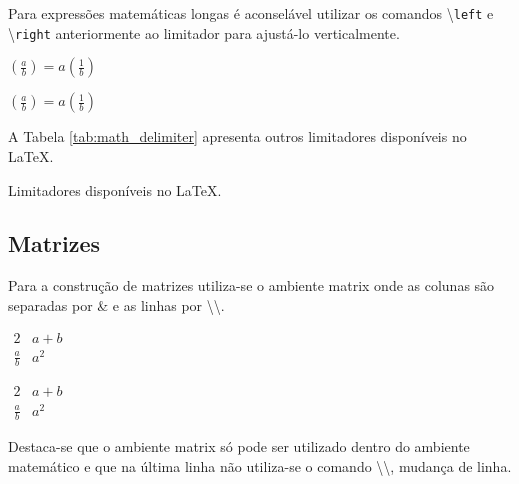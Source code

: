 Para expressões matemáticas longas é aconselável utilizar os comandos \textbackslash\texttt{left} e \textbackslash\texttt{right} anteriormente ao limitador para ajustá-lo verticalmente. \\
\begin{minipage}[t]{0.47\linewidth} \vspace{-8pt}
    \begin{latexcode}
        $\left( \frac{a}{b} \right) = a \left( \frac{1}{b} \right)$
    \end{latexcode}
\end{minipage} \hfill
\begin{minipage}[t]{0.47\linewidth} \vspace{0pt}
    $\left( \frac{a}{b} \right) = a \left( \frac{1}{b} \right)$
\end{minipage}

A Tabela \ref{tab:math_delimiter} apresenta outros limitadores disponíveis no LaTeX.
\begin{table}[h!tb]
    \centering
    \caption{Limitadores disponíveis no LaTeX.}
    \label{tab:math_delimiter}
\end{table}

\subsection{Matrizes}
Para a construção de matrizes utiliza-se o ambiente \textsf{matrix} onde as colunas são separadas por \& e as linhas por \textbackslash\textbackslash. \\
\begin{minipage}[t]{0.47\linewidth} \vspace{-8pt}
    \begin{latexcode}
        $\begin{matrix}
            2 & a+b \\
            \frac{a}{b} & a^2
        \end{matrix}$
    \end{latexcode}
\end{minipage} \hfill
\begin{minipage}[t]{0.47\linewidth} \vspace{0pt}
    $\begin{matrix}
        2 & a+b \\
        \frac{a}{b} & a^2
    \end{matrix}$
\end{minipage}

Destaca-se que o ambiente \textsf{matrix} só pode ser utilizado dentro do ambiente matemático e que na última linha não utiliza-se o comando \textbackslash\textbackslash, mudança de linha.

